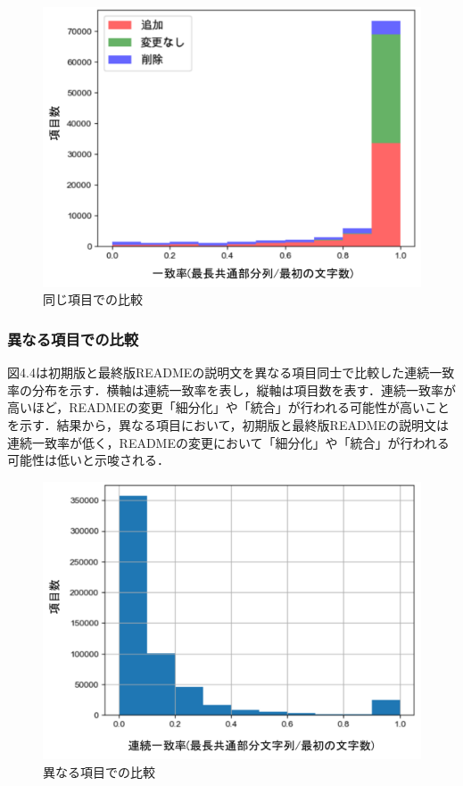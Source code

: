 \documentclass[submit]{ipsj}
\begin{document}
\begin{figure}[t]
 	\centering
		\includegraphics[width=1.0\linewidth]{./IPSJ202303_Ishioka/header_equall2.pdf}
	\caption{同じ項目での比較}
	\label{fig:oss_developments_eq}
\end{figure}






\subsubsection{異なる項目での比較}
図4.4は初期版と最終版READMEの説明文を異なる項目同士で比較した連続一致率の分布を示す．横軸は連続一致率を表し，縦軸は項目数を表す．連続一致率が高いほど，READMEの変更「細分化」や「統合」が行われる可能性が高いことを示す．結果から，異なる項目において，初期版と最終版READMEの説明文は連続一致率が低く，READMEの変更において「細分化」や「統合」が行われる可能性は低いと示唆される．

\begin{figure}[t]
 	\centering
		\includegraphics[width=1.0\linewidth]{./IPSJ202303_Ishioka/header_differ2.pdf}
	\caption{異なる項目での比較}
	\label{fig:oss_developments_df}
\end{figure}
\end{document}

